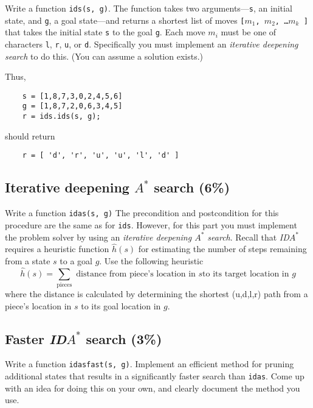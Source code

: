 \documentclass[12pt]{article}
\begin{document}
Write a function {\tt ids(s, g)}.
%
The function takes two arguments---\verb+s+, an initial state, and
\verb+g+, a goal state---and returns a shortest list of moves
{\tt [$m_1$, $m_2$, \ldots $m_k$ ]}
that takes the initial state \verb+s+ to the goal \verb+g+.
Each move $m_i$ must be one of characters {\tt l}, {\tt r}, {\tt u},
or {\tt d}.
Specifically you must implement an {\em iterative deepening search\/}
to do this.
(You can assume a solution exists.)

\medskip

\noindent
Thus,
%
\begin{verbatim}
	s = [1,8,7,3,0,2,4,5,6]
	g = [1,8,7,2,0,6,3,4,5]
	r = ids.ids(s, g);
\end{verbatim}
%
should return
%
\begin{verbatim}
	r = [ 'd', 'r', 'u', 'u', 'l', 'd' ]
\end{verbatim}

 
\subsection{Iterative deepening $A^*$ search \rm(6\%)}

Write a  function {\tt idas(s, g)}
%
The precondition and postcondition for this procedure
are the same as for \verb+ids+.
However, for this part you must implement the problem solver by using an
{\em iterative deepening $A^*$ search}.
Recall that
{\em ID}$A^*$ requires a heuristic function $\hat{h}(s)$ for estimating
the number of steps remaining from a state $s$ to a goal $g$.
Use the following heuristic
\[
\hat{h}(s) = \sum_{\mbox{pieces}} \mbox{ distance from piece's location in $s$
to its target location in $g$}
\]
where the distance is calculated by determining the shortest (u,d,l,r) path 
from a piece's location in $s$ to its goal location in $g$.



\subsection{Faster {\em ID}$A^*$ search \rm(3\%)}

Write a function {\tt idasfast(s, g)}.
%
Implement an efficient method for pruning additional states 
that results in a significantly faster search than {\tt idas}.
Come up with an idea for doing this on your own, 
and clearly document the method you use.

\newpage
\end{document}
